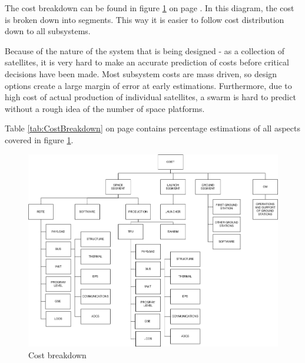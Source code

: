 The cost breakdown can be found in figure \ref{fig:costbreak} on page \pageref{fig:costbreak}. In this diagram, the cost is broken down into segments. This way it is easier to follow cost distribution down to all subsystems.

Because of the nature of the system that is being designed - as a collection of satellites, it is very hard to make an accurate prediction of costs before critical decisions have been made. Most subsystem costs are mass driven, so design options create a large margin of error at early estimations. Furthermore, due to high cost of actual production of individual satellites, a swarm is hard to predict without a rough idea of the number of space platforms.

Table \ref{tab:CostBreakdown} on page \pageref{tab:CostBreakdown} contains percentage estimations of all aspects covered in figure \ref{fig:costbreak}.

\begin{figure}[H]
\begin{center}

\includegraphics[width=1.0\textwidth,angle=90]{chapters/img/costbreakdown.jpg}
\caption{Cost breakdown}
\label{fig:costbreak}
\end{center}
\end{figure}

